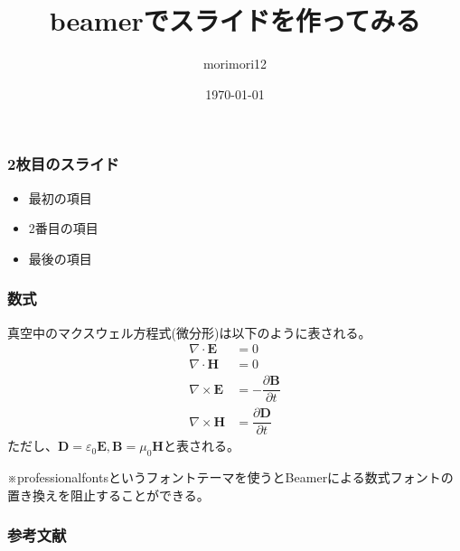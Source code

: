 \documentclass{beamer}
\title{beamerでスライドを作ってみる}
\author{morimori12}
\date{\today}
\begin{document}
\begin{frame}
  \titlepage
\end{frame}

\begin{frame}
  \frametitle{2枚目のスライド}
  \begin{itemize}
    \item 最初の項目
    \item 2番目の項目
    \item 最後の項目
  \end{itemize}
\end{frame}

\begin{frame}
  \frametitle{数式}
  真空中のマクスウェル方程式(微分形)は以下のように表される。
  \begin{align}
    \nabla \cdot \bm{E}  & = 0                                   \\
    \nabla \cdot \bm{H}  & = 0                                   \\
    \nabla \times \bm{E} & = -\dfrac{\partial\bm{B}}{\partial t} \\
    \nabla \times \bm{H} & = \dfrac{\partial\bm{D}}{\partial t}
  \end{align}
  ただし、$\bm{D}=\varepsilon_0 \bm{E},\bm{B}=\mu_0 \bm{H}$と表される。

  ※professionalfontsというフォントテーマを使うとBeamerによる数式フォントの置き換えを阻止することができる。\cite{takoyaki}
\end{frame}

\begin{frame}
  \frametitle{参考文献}
\end{frame}
\end{document}
